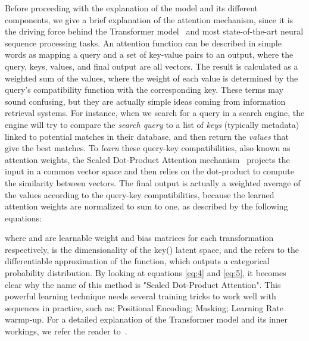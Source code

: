 \documentclass{article}
\begin{document}
Before proceeding with the explanation of the model and its different components, we give a brief explanation of the attention mechanism, since it is the driving force behind the Transformer model~\cite{vaswani2017attention} and most state-of-the-art neural sequence processing tasks. An attention function can be described in simple words as mapping a query and a set of key-value pairs to an output, where the query, keys, values, and final output are all vectors. The result is calculated as a weighted sum of the values, where the weight of each value is determined by the query's compatibility function with the corresponding key. These terms may sound confusing, but they are actually simple ideas coming from information retrieval systems. For instance, when we search for a query in a search engine, the engine will try to compare the \textit{search query} to a list of \textit{keys} (typically metadata) linked to potential matches in their database, and then return the \textit{values} that give the best matches. To \emph{learn} these query-key compatibilities, also known as attention weights, the Scaled Dot-Product Attention mechanism~\cite{vaswani2017attention} projects the input in a common vector space and then relies on the dot-product to compute the similarity between vectors. The final output is actually a weighted average of the values according to the query-key compatibilities, because the learned attention weights are normalized to sum to one, as described by the following equations:

where  and  are learnable weight and bias matrices for each transformation respectively,  is the dimensionality of the key() latent space, and the  refers to the differentiable approximation of the  function, which outputs a categorical probability distribution. By looking at equations \ref{eq:4} and \ref{eq:5}, it becomes clear why the name of this method is "Scaled Dot-Product Attention". This powerful learning technique needs several training tricks to work well with sequences in practice, such as: Positional Encoding; Masking; Learning Rate warmp-up. For a detailed explanation of the Transformer model and its inner workings, we refer the reader to~\cite{vaswani2017attention}.  
\end{document}
